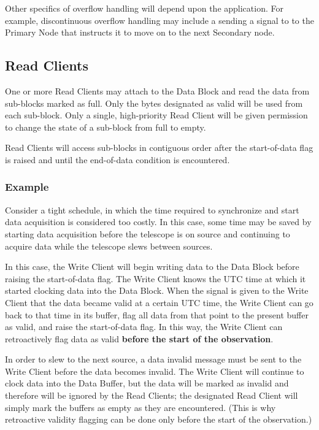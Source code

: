 Other specifics of overflow handling will depend upon the application.
For example, discontinuous overflow handling may include a sending a
signal to to the Primary Node that instructs it to move on to the next
Secondary node.

\subsection{Read Clients}

One or more Read Clients may attach to the Data Block and read the
data from sub-blocks marked as full.  Only the bytes designated as
valid will be used from each sub-block.  Only a single, high-priority
Read Client will be given permission to change the state of a
sub-block from full to empty.  

Read Clients will access sub-blocks in contiguous order after the
start-of-data flag is raised and until the end-of-data condition is
encountered.

\subsubsection{Example}

Consider a tight schedule, in which the time required to synchronize
and start data acquisition is considered too costly.  In this case,
some time may be saved by starting data acquisition before the
telescope is on source and continuing to acquire data while the
telescope slews between sources.

In this case, the Write Client will begin writing data to the Data
Block before raising the start-of-data flag.  The Write Client knows
the UTC time at which it started clocking data into the Data Block.
When the signal is given to the Write Client that the data became
valid at a certain UTC time, the Write Client can go back to that time
in its buffer, flag all data from that point to the present buffer as
valid, and raise the start-of-data flag.  In this way, the Write
Client can retroactively flag data as valid {\bf before the start of
the observation}.

In order to slew to the next source, a data invalid message must be
sent to the Write Client before the data becomes invalid.  The Write
Client will continue to clock data into the Data Buffer, but the data
will be marked as invalid and therefore will be ignored by the Read
Clients; the designated Read Client will simply mark the buffers as
empty as they are encountered. (This is why retroactive validity
flagging can be done only before the start of the observation.)

